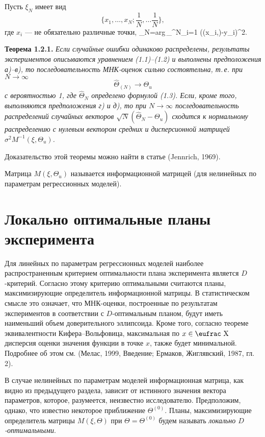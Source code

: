 Пусть $\xi_N$ имеет вид
$$
\{x_1,\ldots,x_N;\frac{1}{N},\ldots\frac{1}{N}\},
$$
где $x_i$ --- не обязательно различные точки, \beq
\hat\Theta_N={\rm{arg}}\,\min_{\Theta\in\Omega}\sum^N_{i=1}
(\eta(x_i,\Theta)-y_i)^2. \eeq

{\bf Теорема 1.2.1.} {\it Если случайные ошибки одинаково
распределены, результаты экспериментов описываются уравнением
(1.1)--(1.2) и выполнены предположения а)--в), то последовательность
МНК-оценок сильно состоятельна, т.\,е. при $N\to\infty$
$$
\hat\Theta_{(N)}\to\Theta_u
$$
с вероятностью 1, где $\hat\Theta_N$ определено формулой (1.3).
Если, кроме того, выполняются предположения г) и д), то при
$N\to\infty$ последовательность распределений случайных векторов
$\sqrt{N}(\hat\Theta_N-\Theta_u)$ сходится к нормальному
распределению с нулевым вектором средних и дисперсионной матрицей
$\sigma^2M^{-1}(\xi,\Theta_u)$.}

Доказательство этой теоремы можно найти в статье (Jennrich, 1969).

Матрица $M(\xi,\Theta_u)$ называется информационной матрицей (для
нелинейных по параметрам регрессионных моделей).
\bigskip

\section{\bf Локально оптимальные планы эксперимента}

Для линейных по параметрам регрессионных моделей наиболее
распространенным критерием оптимальности плана эксперимента является
$D$-критерий. Согласно этому критерию оптимальными считаются планы,
максимизирующие определитель информационной матрицы. В
статистическом смысле это означает, что МНК-оценки, построенные по
результатам экспериментов в соответствии с $D$-оптимальным планом,
будут иметь наименьший объем доверительного эллипсоида. Кроме того,
согласно теореме эквивалентности Кифера--Вольфовица, максимальная по
$x\in{\mbox{\eufrac X}}$ дисперсия оценки значения функции в точке
$x$, также будет минимальной. Подробнее об этом см. (Мелас, 1999,
Введение; Ермаков, Жиглявский, 1987, гл.\,2).

В случае нелинейных по параметрам моделей информационная матрица,
как видно из предыдущего раздела, зависит от истинного значения
вектора параметров, которое, разумеется, неизвестно исследователю.
Предположим, однако, что известно некоторое приближение
$\Theta^{(0)}$. Планы, максимизирующие определитель матрицы
$M(\xi,\Theta)$ при $\Theta=\Theta^{(0)}$ будем называть {\it
локально $D$-оптимальными}.

